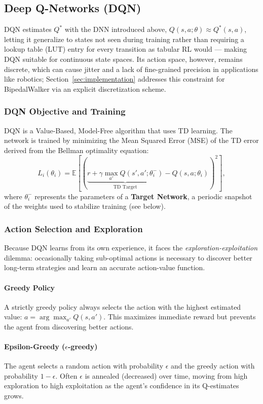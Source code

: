 \subsection{Deep Q-Networks (DQN)}

DQN estimates $Q^*$ with the DNN introduced above, $Q(s, a; \theta) \approx Q^*(s, a)$, letting it generalize to states not seen during training rather than requiring a lookup table (LUT) entry for every transition as tabular RL would — making DQN suitable for continuous state spaces. Its action space, however, remains discrete, which can cause jitter and a lack of fine-grained precision in applications like robotics; Section~\ref{sec:implementation} addresses this constraint for BipedalWalker via an explicit discretization scheme.

\subsubsection{DQN Objective and Training}
DQN is a Value-Based, Model-Free algorithm that uses TD learning. The network is trained by minimizing the Mean Squared Error (MSE) of the TD error derived from the Bellman optimality equation:
\begin{equation}
    L_i(\theta_i) = \mathbb{E} \left[ \left( \underbrace{r + \gamma \max_{a'} Q(s', a'; \theta_i^-)}_{\text{TD Target}} - Q(s, a; \theta_i) \right)^2 \right],
\end{equation}
where $\theta_i^-$ represents the parameters of a \textbf{Target Network}, a periodic snapshot of the weights used to stabilize training (see below).

\subsubsection{Action Selection and Exploration}
Because DQN learns from its own experience, it faces the \textit{exploration-exploitation} dilemma: occasionally taking sub-optimal actions is necessary to discover better long-term strategies and learn an accurate action-value function.

\paragraph{Greedy Policy}
A strictly greedy policy always selects the action with the highest estimated value: $a = \arg\max_{a'} Q(s, a')$. This maximizes immediate reward but prevents the agent from discovering better actions.

\paragraph{Epsilon-Greedy ($\epsilon$-greedy)}
The agent selects a random action with probability $\epsilon$ and the greedy action with probability $1-\epsilon$. Often $\epsilon$ is annealed (decreased) over time, moving from high exploration to high exploitation as the agent's confidence in its Q-estimates grows.

